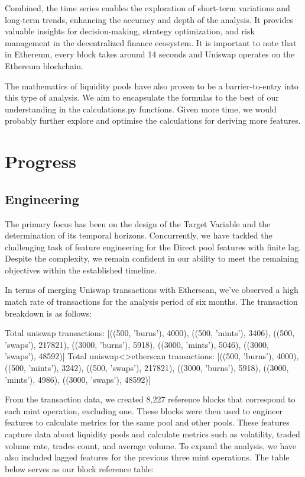\documentclass{article}
\begin{document}
{Combined, the time series enables the exploration of short-term variations and long-term trends, enhancing the accuracy and depth of the analysis.  It provides valuable insights for decision-making, strategy optimization, and risk management in the decentralized finance ecosystem.
It is important to note that in Ethereum, every block takes around 14 seconds and Uniswap operates on the Ethereum blockchain.

The mathematics of liquidity pools have also proven to be a barrier-to-entry into this type of analysis. We aim to encapsulate the formulas to the best of our understanding in the calculations.py functions. Given more time, we would probably further explore and optimise the calculations for deriving more features.

\section*{Progress}

\subsection*{Engineering}

The primary focus has been on the design of the Target Variable and the determination of its temporal horizons. Concurrently, we have tackled the challenging task of feature engineering for the Direct pool features with finite lag. Despite the complexity, we remain confident in our ability to meet the remaining objectives within the established timeline. 

In terms of merging Uniswap transactions with Etherscan, we've observed a high match rate of transactions for the analysis period of six months. The transaction breakdown is as follows:

Total uniswap transactions:
[((500, 'burns'), 4000), ((500, 'mints'), 3406), ((500, 'swaps'), 217821), ((3000, 'burns'), 5918), ((3000, 'mints'), 5046), ((3000, 'swaps'), 48592)]
Total uniswap<>etherscan transactions:
[((500, 'burns'), 4000), ((500, 'mints'), 3242), ((500, 'swaps'), 217821), ((3000, 'burns'), 5918), ((3000, 'mints'), 4986), ((3000, 'swaps'), 48592)]

From the transaction data, we created 8,227 reference blocks that correspond to each mint operation, excluding one. These blocks were then used to engineer features to calculate metrics for the same pool and other pools. These features capture data about liquidity pools and calculate metrics such as volatility, traded volume rate, trades count, and average volume. To expand the analysis, we have also included lagged features for the previous three mint operations. The table below serves as our block reference table:

}
\end{document}
